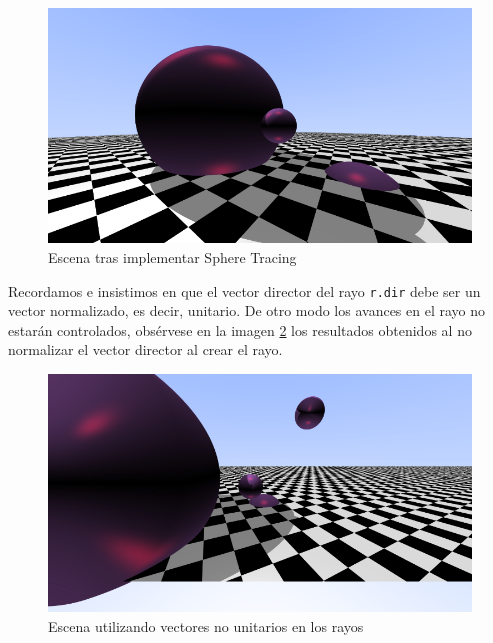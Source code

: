 \begin{figure} [ht]
    \centering
    \includegraphics[scale = 0.35]{img/C8/esferas-sphere-tracing.png}
    \caption{Escena tras implementar Sphere Tracing}
    \label{fig:esferas-ST}
\end{figure}

Recordamos e insistimos en que el vector director del rayo \verb|r.dir| debe ser un vector normalizado, es decir, unitario. De otro modo los avances en el rayo no estarán controlados, obsérvese en la imagen \ref{fig:vectores-no-normalizados} los resultados obtenidos al no normalizar el vector director al crear el rayo.

\begin{figure} [ht]
    \centering
    \includegraphics[scale = 0.35]{img/C8/vectores-no-normalizados.png}
    \caption{Escena utilizando vectores no unitarios en los rayos}
    \label{fig:vectores-no-normalizados}
\end{figure}

